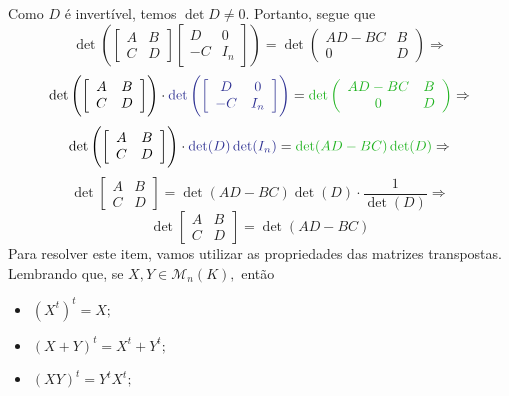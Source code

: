 \documentclass[11pt,a4paper]{article}
\begin{document}
{{\[    \]
    Como $D$ é invertível, temos $\det D \neq 0.$ Portanto, segue que 
    \[
       \det \left(\left[ \begin{array}{cc} A & B \\ C & D \end{array} \right]  \left[ \begin{array}{cc} D & 0 \\ -C & I_n \end{array} \right] \right) = \det \left( \begin{array}{cc} AD - BC & B \\ 0 & D \end{array} \right) \Rightarrow \]
       \[\det \left(\left[ \begin{array}{cc} A & B \\ C & D \end{array} \right]\right)  \cdot \textcolor{Blue}{\det \left( \left[ \begin{array}{cc} D & 0 \\ -C & I_n \end{array} \right] \right)} = \textcolor{Verde}{ \det \left( \begin{array}{cc} AD - BC & B \\ 0 & D \end{array} \right)} \Rightarrow \]
       \[\det \left(\left[ \begin{array}{cc} A & B \\ C & D \end{array} \right]\right)  \cdot \textcolor{Blue}{\det(D) \det(I_n)} = \textcolor{Verde}{ \det (AD - BC) \det(D)}\Rightarrow \]
       \[   \det \left[ \begin{array}{cc} A & B \\ C & D \end{array} \right]= \det (AD - BC) \det(D)\cdot \frac{1}{\det(D)} \Rightarrow  \]
       \[  \boxed{\det \left[ \begin{array}{cc} A & B \\ C & D \end{array} \right] = \det (AD - BC)  } \]
           \task[\pers{c}] Para resolver este item, vamos utilizar as propriedades das matrizes transpostas. Lembrando que, se $X, Y \in \mathcal{M}_n(K),$ então
           \begin{itemize}
           \item $(X^t)^t = X;$
               \item $(X + Y)^t = X^t + Y^t;$
               \item $(XY)^t = Y^tX^t;$

\end{itemize}}}
\end{document}

